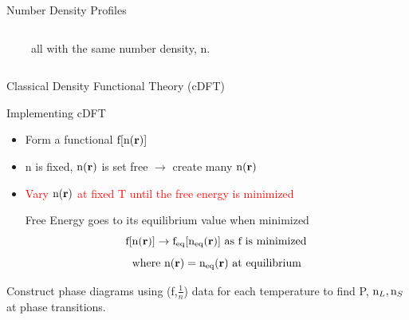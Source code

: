 \documentclass{beamer}
\renewcommand{\vec}[1]{\mathbf{#1}}
\begin{document}
\begin{frame}{Number Density Profiles}
\begin{columns}[t]
    $~~~~~~~~~~$all with the same number density, n.
	\end{columns}
\end{frame}

\begin{frame}{Classical Density Functional Theory (cDFT)}
    \begin{block}{Implementing cDFT}
    \begin{itemize}
       \item Form a functional $\text f[\text n(\vec r)]$  \checkmark
       \item n is fixed, $\text n(\vec{r})$ is set free $\rightarrow$ create many $\text n(\vec{r})$ \checkmark
       \item \textcolor{red}{Vary $\text n(\vec{r})$ at fixed T until the free energy is minimized} 
       
       Free Energy goes to its equilibrium value when minimized      
       \begin{displaymath}\text f[\text n(\vec r)]\rightarrow \text f_{\text{eq}}[\text n_{\text{eq}}(\vec r)]  \mbox{ as f is minimized} \end{displaymath}
       \begin{displaymath}{\mbox{where }  \text n(\vec{r}) = \text n_{\text{eq}}(\vec r)  \mbox{ at equilibrium}}\end{displaymath}              
    \end{itemize}   
    
       Construct phase diagrams using (f,$\frac{1}{n}$) data for each temperature to find P, $\text n_L, \text n_S$  at phase transitions.
 
     \end{block}
\end{frame}
\end{document}
